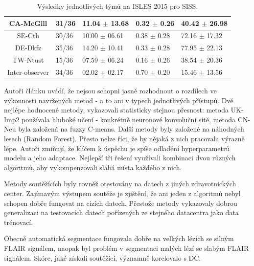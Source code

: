 \documentclass[11pt]{article}
\begin{document}
\begin{table}[]
\begin{tabular}{cllll}
		CA-McGill       & 31/36                              & 11.04 $\pm$ 13.68                         & 0.32 $\pm$ 0.26                              & 40.42 $\pm$ 26.98                       \\ \hline
		SE-Cth          & 30/36                              & 10.00 $\pm$ 06.61                         & 0.38 $\pm$ 0.28                              & 72.16 $\pm$ 17.32                       \\ \hline
		DE-Dkfz         & 35/36                              & 14.20 $\pm$ 10.41                         & 0.33 $\pm$ 0.28                              & 77.95 $\pm$ 22.13                       \\ \hline
		TW-Ntust        & 15/36                              & 07.59 $\pm$ 06.24                         & 0.16 $\pm$ 0.26                              & 38.54 $\pm$ 20.36                       \\ \hline
		Inter-observer  & 34/36                              & 02.02 $\pm$ 02.17                         & 0.70 $\pm$ 0.20                              & 15.46 $\pm$ 13.56                       \\ \hline
	\end{tabular}
	\caption{Výsledky jednotlivých týmů na ISLES 2015 pro SISS.}
\end{table}

Autoři článku uvádí, že nejsou schopni jasně rozhodnout o rozdílech ve výkonnosti navržených metod - a to ani v typech jednotlivých přístupů. Dvě nejlépe hodnocené metody, vykazovali statisticky stejnou přesnost: metoda UK-Imp2 používala hluboké učení - konkrétně \alert{neuronové konvoluční sítě}, metoda CN-Neu byla založená na fuzzy C-means. Další metody byly založené na náhodných lesech (\alert{Random Forest}). Přesto nelze říci, že by nějaká z nich pracovala výrazně lépe. Autoři zmiňují, že klíčem k úspěchu je spíše odladění hyperparametrů modelu a jeho adaptace. Nejlepší tři řešení využívali kombinaci dvou různých algoritmů, aby vykompenzovali slabá místa každého z nich.

Metody soutěžících byly rovněž otestovány na datech z jiných zdravotnických center. Zajímavým výstupem soutěže je zjištění, že ani jeden z algoritmů nebyl schopen dobře fungovat na cizích datech. Přestože metody vykazovaly dobrou generalizaci na testovacích datech pořízených ze stejného datacentra jako data trénovací.

Obecně automatická segmentace fungovala dobře na velkých lézích se silným FLAIR signálem, naopak byl problém v segmentaci malých lézí se slabým FLAIR signálem. Skóre, jaké získali soutěžící, významně korelovalo s DC. 
\end{document}
